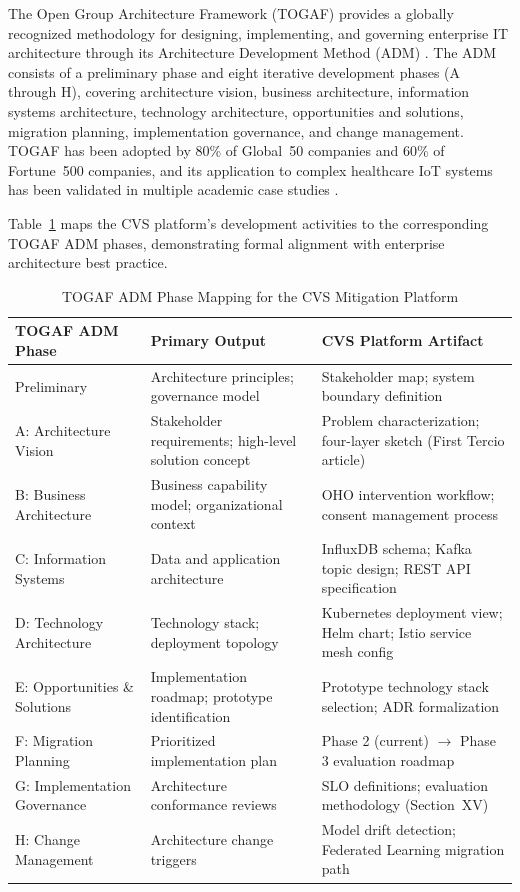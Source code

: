 \documentclass[conference]{IEEEtran}
\begin{document}
The Open Group Architecture Framework (TOGAF) provides a globally recognized methodology
for designing, implementing, and governing enterprise IT architecture through its
Architecture Development Method (ADM) \cite{b24}. The ADM consists of a preliminary
phase and eight iterative development phases (A through H), covering architecture vision,
business architecture, information systems architecture, technology architecture,
opportunities and solutions, migration planning, implementation governance, and change
management. TOGAF has been adopted by 80\% of Global~50 companies and 60\% of
Fortune~500 companies, and its application to complex healthcare IoT systems has been
validated in multiple academic case studies \cite{b25}.

Table~\ref{tab:togaf} maps the CVS platform's development activities to the corresponding
TOGAF ADM phases, demonstrating formal alignment with enterprise architecture best practice.

\begin{table}[H]
  \centering
  \caption{TOGAF ADM Phase Mapping for the CVS Mitigation Platform}
  \label{tab:togaf}
  \begin{tabularx}{\textwidth}{p{3cm} p{4cm} X}
    \toprule
    \textbf{TOGAF ADM Phase} & \textbf{Primary Output} & \textbf{CVS Platform Artifact} \\
    \midrule
    Preliminary & Architecture principles; governance model &
      Stakeholder map; system boundary definition \\
    A: Architecture Vision & Stakeholder requirements; high-level solution concept &
      Problem characterization; four-layer sketch (First Tercio article) \\
    B: Business Architecture & Business capability model; organizational context &
      OHO intervention workflow; consent management process \\
    C: Information Systems & Data and application architecture &
      InfluxDB schema; Kafka topic design; REST API specification \\
    D: Technology Architecture & Technology stack; deployment topology &
      Kubernetes deployment view; Helm chart; Istio service mesh config \\
    E: Opportunities \& Solutions & Implementation roadmap; prototype identification &
      Prototype technology stack selection; ADR formalization \\
    F: Migration Planning & Prioritized implementation plan &
      Phase 2 (current) $\rightarrow$ Phase 3 evaluation roadmap \\
    G: Implementation Governance & Architecture conformance reviews &
      SLO definitions; evaluation methodology (Section~XV) \\
    H: Change Management & Architecture change triggers &
      Model drift detection; Federated Learning migration path \\
    \bottomrule
  \end{tabularx}
\end{table}
\end{document}
